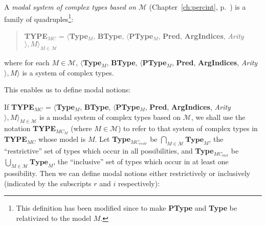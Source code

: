 A \textit{modal system of complex types based on $\mathcal{M}$}
(Chapter~\ref{ch:percint}, p.~\pageref{ex:modalsys-complex}) is a
family of quadruples\footnote{This definition has been modified since
  \cite{Cooper2012} to make \textbf{PType} and \textbf{Type} be
  relativized to the model $M$.}:
\begin{quote}
{\bf TYPE$_{\mathit{MC}}$} = $\langle${\bf Type}$_M$, {\bf BType},
$\langle$\textbf{PType}$_M$, {\bf Pred}, \textbf{ArgIndices}, {\it Arity\/}$\rangle, M\rangle_{M\in\mathcal{M}}$
\end{quote}
where for each $M\in \mathcal{M}$, $\langle${\bf Type}$_M$, {\bf BType},
$\langle$\textbf{PType}$_M$, {\bf Pred}, \textbf{ArgIndices}, {\it Arity\/}$\rangle, M\rangle$ is
a system of complex types.

This enables us to define modal notions:

If {\bf TYPE$_{\mathit{MC}}$} = $\langle${\bf Type}$_M$, {\bf BType},
$\langle$\textbf{PType}$_M$, {\bf Pred}, \textbf{ArgIndices}, {\it Arity\/}$\rangle, M\rangle_{M\in\mathcal{M}}$
is a modal system of complex types based
on $\mathcal{M}$, we shall use the notation {\bf
  TYPE$_{\mathit{MC}_M}$} (where $M\in\mathcal{M}$) to refer to that
system of complex types in {\bf TYPE$_{\mathit{MC}}$} whose model is
$M$.  Let \textbf{Type}$_{\mathit{MC}_{\mathit{restr}}}$ be
  $\bigcap\limits_{M\in\mathcal{M}}\!\textbf{Type}_M$, the
  ``restrictive'' set of
  types which occur in all possibilities,  and \textbf{Type}$_{\mathit{MC}_{\mathit{incl}}}$ be
  $\bigcup\limits_{M\in\mathcal{M}}\!\textbf{Type}_M$, the
  ``inclusive'' set of
  types which occur in at least one possibility.  Then we can define
  modal notions either restrictively or inclusively (indicated by the
  subscripts $r$ and $i$ respectively):

